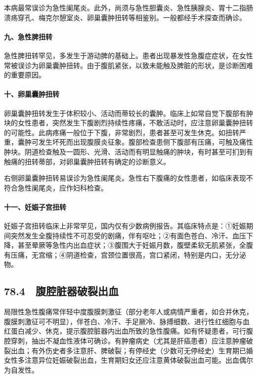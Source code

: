 本病最常误诊为急性阑尾炎。此外，尚须与急性胆囊炎、急性胰腺炎、胃十二指肠溃疡穿孔、梅克尔憩室炎、卵巢囊肿扭转等相鉴别。一般都经手术探查而确诊。

\paragraph{九、急性脾扭转}

急性脾扭转罕见，多发生于游动脾的基础上。患者出现暴发性急腹症症状，在女性常被误诊为卵巢囊肿扭转。由于腹肌紧张，以致未能触及脾脏的形状，是诊断困难的重要原因。

\paragraph{十、卵巢囊肿扭转}

卵巢囊肿扭转发生于体积较小、活动而蒂较长的囊肿。临床上如常自觉下腹部有肿块的女性患者，突然发生下腹剧烈持续性疼痛，不敢活动时，应注意卵巢囊肿扭转的可能性。此病疼痛一般位于下腹，非常剧烈，患者甚至可发生休克。如扭转严重，囊肿可发生坏死而出现腹膜炎征象。腹部检查患侧下腹部有压痛，可触及痛性肿块。阴道检查触及一圆形、光滑、活动而有明显触痛的肿块，有时甚至可扪到有触痛的扭转蒂部，对卵巢囊肿扭转有确定的诊断意义。

右侧卵巢囊肿扭转易误诊为急性阑尾炎。急性右下腹痛的女性患者，如临床表现不符合急性阑尾炎，应作妇科检查。

\paragraph{十一、妊娠子宫扭转}

妊娠子宫扭转临床上非常罕见，国内仅有少数病例报告。其临床特点是：①妊娠期间突然发生全腹持续性不可忍受的剧痛，伴有呕吐；②有面色苍白、冷汗、血压下降，甚至晕厥等急性内出血症状；③腹围大于妊娠月数，腹壁柔软无肌紧张，全腹有压痛，无宫缩；④阴道检查，宫颈位置很高，宫口紧闭，特别是内口，无分泌物。

\protect\hypertarget{text00197.html}{}{}

\subsection{78.4　腹腔脏器破裂出血}

局限性急性腹痛常伴轻中度腹膜刺激征（部分老年人或病情严重者，如合并休克，腹膜刺激征可不明显），伴苍白、冷汗、手足厥冷、脉搏细数、进行性红细胞与血红蛋白减少、休克，提示腹腔脏器内出血所致的急性腹痛。如有怀疑患者，可行腹腔穿刺，抽出不凝血性液体可确诊。有肿瘤病史（尤其是肝癌患者）应注意肿瘤破裂出血；有外伤史者多注意肝、脾破裂；有停经史（少数可无停经史）生育期已婚女性多注意异位妊娠破裂出血，生育期妇女还应注意黄体破裂出血可能。出血偶尔为自发性。

